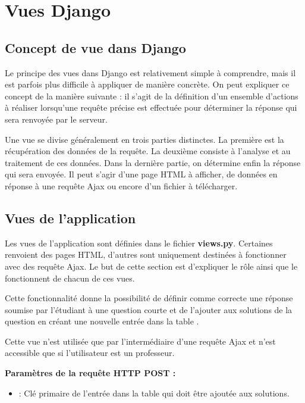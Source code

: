 \documentclass[a4,10pt,french]{sphinxmanual}
\begin{document}
\chapter{Vues Django}
\label{source::doc}\label{source:vues-django}

\section{Concept de vue dans Django}
\label{source:concept-de-vue-dans-django}
Le principe des vues dans Django est relativement simple à comprendre, mais il est parfois
plus difficile à appliquer de manière concrète. On peut expliquer ce concept de
la manière suivante : il s'agit de la définition d'un ensemble d'actions à réaliser
lorsqu'une requête précise est effectuée pour déterminer la réponse qui sera renvoyée
par le serveur.

Une vue se divise généralement en trois parties distinctes.
La première est la récupération des données de la requête. La deuxième consiste
à l'analyse et au traitement de ces données. Dans la dernière partie, on détermine
enfin la réponse qui sera envoyée. Il peut s'agir d'une page HTML à afficher, de
données en réponse à une requête Ajax ou encore d'un fichier à télécharger.


\section{Vues de l'application}
\label{source:vues-de-l-application}
Les vues de l'application sont définies dans le fichier \textbf{views.py}. Certaines renvoient
des pages HTML, d'autres sont uniquement destinées à fonctionner avec des requête Ajax.
Le but de cette section est d'expliquer le rôle ainsi que le fonctionnent de chacun de ces vues.
\label{source:module-quiz.views}

\begin{fulllineitems}
\label{source:quiz.views.add_correct_answer}
Cette fonctionnalité donne la possibilité de définir comme correcte une réponse
soumise par l'étudiant à une question courte et de l'ajouter aux solutions de
la question en créant une nouvelle entrée dans la table .

Cette vue n'est utilisée que par l'intermédiaire d'une requête Ajax et n'est
accessible que si l'utilisateur est un professeur.

\textbf{Paramètres de la requête HTTP POST :}
\begin{itemize}
\item {} 
 : Clé primaire de l'entrée dans la table  qui doit être ajoutée aux solutions.

\end{itemize}

\end{fulllineitems}
\end{document}
